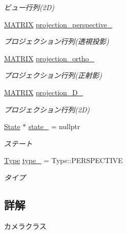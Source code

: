 \begin{DoxyCompactItemize}
\begin{DoxyCompactList}\small\item\em ビュー行列(2\+D) \end{DoxyCompactList}\item 
\mbox{\hyperlink{_vector3_d_8h_a032295cd9fb1b711757c90667278e744}{M\+A\+T\+R\+IX}} \mbox{\hyperlink{class_camera_ab0abb153efc1642da91ec0716847231c}{projection\+\_\+perspective\+\_\+}}
\begin{DoxyCompactList}\small\item\em プロジェクション行列(透視投影) \end{DoxyCompactList}\item 
\mbox{\hyperlink{_vector3_d_8h_a032295cd9fb1b711757c90667278e744}{M\+A\+T\+R\+IX}} \mbox{\hyperlink{class_camera_a624f360dabc01f89cc988ca16599eff4}{projection\+\_\+ortho\+\_\+}}
\begin{DoxyCompactList}\small\item\em プロジェクション行列(正射影) \end{DoxyCompactList}\item 
\mbox{\hyperlink{_vector3_d_8h_a032295cd9fb1b711757c90667278e744}{M\+A\+T\+R\+IX}} \mbox{\hyperlink{class_camera_a67951793f883b6b9372ea08213278eee}{projection\+\_\+D\+\_\+}}
\begin{DoxyCompactList}\small\item\em プロジェクション行列(2\+D) \end{DoxyCompactList}\item 
\mbox{\hyperlink{class_camera_1_1_state}{State}} $\ast$ \mbox{\hyperlink{class_camera_ab2f0ce08b9fee8a4481b323f2856b245}{state\+\_\+}} = nullptr
\begin{DoxyCompactList}\small\item\em ステート \end{DoxyCompactList}\item 
\mbox{\hyperlink{class_camera_a3b0a1f58deca679ac665f61c480d1dcb}{Type}} \mbox{\hyperlink{class_camera_a18f6d287c98a979a2ca1579eb928d9aa}{type\+\_\+}} = Type\+::\+P\+E\+R\+S\+P\+E\+C\+T\+I\+VE
\begin{DoxyCompactList}\small\item\em タイプ \end{DoxyCompactList}\end{DoxyCompactItemize}


\subsection{詳解}
カメラクラス 


